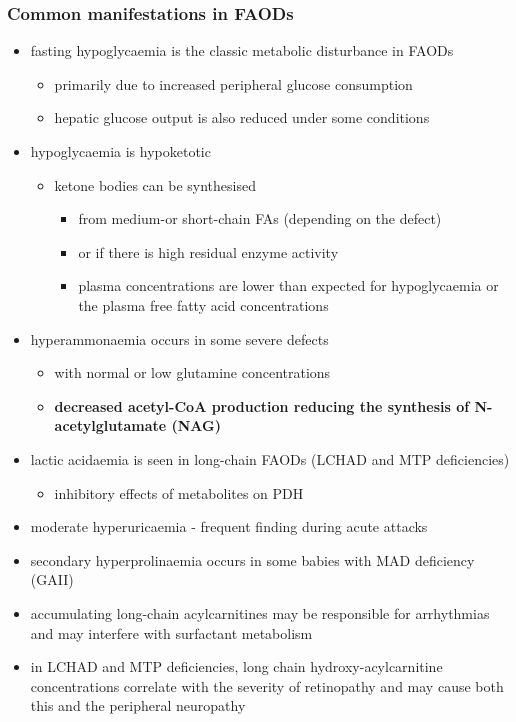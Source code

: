 \documentclass[12pt]{scrartcl}
\begin{document}
\subsubsection{Common manifestations in FAODs}
\label{sec:org629fe6a}
\begin{itemize}
\item fasting hypoglycaemia is the classic metabolic disturbance in FAODs
\begin{itemize}
\item primarily due to increased peripheral glucose consumption
\item hepatic glucose output is also reduced under some conditions
\end{itemize}
\item hypoglycaemia is hypoketotic
\begin{itemize}
\item ketone bodies can be synthesised
\begin{itemize}
\item from medium-or short-chain FAs (depending on the defect)
\item or if there is high residual enzyme activity
\item plasma concentrations are lower than expected for hypoglycaemia or the plasma free fatty acid concentrations
\end{itemize}
\end{itemize}
\item hyperammonaemia occurs in some severe defects
\begin{itemize}
\item with normal or low glutamine concentrations
\item \textbf{decreased acetyl-CoA production reducing the synthesis of N-acetylglutamate (NAG)}
\end{itemize}
\item lactic acidaemia is seen in long-chain FAODs (LCHAD and MTP deficiencies)
\begin{itemize}
\item inhibitory effects of metabolites on PDH
\end{itemize}
\item moderate hyperuricaemia - frequent finding during acute attacks
\item secondary hyperprolinaemia occurs in some babies with MAD deficiency (GAII)
\item accumulating long-chain acylcarnitines may be responsible for
arrhythmias and may interfere with surfactant metabolism
\item in LCHAD and MTP deficiencies, long chain hydroxy-acylcarnitine
concentrations correlate with the severity of retinopathy and may
cause both this and the peripheral neuropathy
\end{itemize}
\end{document}
